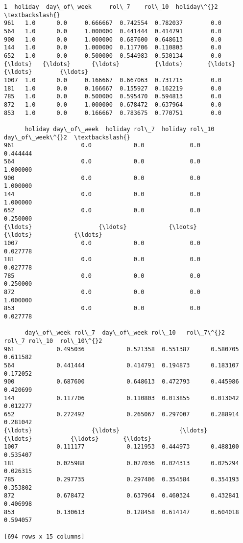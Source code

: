 \documentclass[11pt]{article}
\makeatletter
\newcommand{\boxspacing}{\kern\kvtcb@left@rule\kern\kvtcb@boxsep}
\newcommand{\prompt}[4]{
        {\ttfamily\llap{{\color{#2}[#3]:\hspace{3pt}#4}}\vspace{-\baselineskip}}
    }
\makeatother
\begin{document}
            \begin{tcolorbox}[breakable, size=fbox, boxrule=.5pt, pad at break*=1mm, opacityfill=0]
\prompt{Out}{outcolor}{151}{\boxspacing}
\begin{Verbatim}[commandchars=\\\{\}]
        1  holiday  day\_of\_week     rol\_7    rol\_10  holiday\^{}2  \textbackslash{}
961   1.0      0.0     0.666667  0.742554  0.782037        0.0
564   1.0      0.0     1.000000  0.441444  0.414791        0.0
900   1.0      0.0     1.000000  0.687600  0.648613        0.0
144   1.0      0.0     1.000000  0.117706  0.110803        0.0
652   1.0      0.0     0.500000  0.544983  0.530134        0.0
{\ldots}   {\ldots}      {\ldots}          {\ldots}       {\ldots}       {\ldots}        {\ldots}
1007  1.0      0.0     0.166667  0.667063  0.731715        0.0
181   1.0      0.0     0.166667  0.155927  0.162219        0.0
785   1.0      0.0     0.500000  0.595470  0.594813        0.0
872   1.0      0.0     1.000000  0.678472  0.637964        0.0
853   1.0      0.0     0.166667  0.783675  0.770751        0.0

      holiday day\_of\_week  holiday rol\_7  holiday rol\_10  day\_of\_week\^{}2  \textbackslash{}
961                   0.0            0.0             0.0       0.444444
564                   0.0            0.0             0.0       1.000000
900                   0.0            0.0             0.0       1.000000
144                   0.0            0.0             0.0       1.000000
652                   0.0            0.0             0.0       0.250000
{\ldots}                   {\ldots}            {\ldots}             {\ldots}            {\ldots}
1007                  0.0            0.0             0.0       0.027778
181                   0.0            0.0             0.0       0.027778
785                   0.0            0.0             0.0       0.250000
872                   0.0            0.0             0.0       1.000000
853                   0.0            0.0             0.0       0.027778

      day\_of\_week rol\_7  day\_of\_week rol\_10   rol\_7\^{}2  rol\_7 rol\_10  rol\_10\^{}2
961            0.495036            0.521358  0.551387      0.580705  0.611582
564            0.441444            0.414791  0.194873      0.183107  0.172052
900            0.687600            0.648613  0.472793      0.445986  0.420699
144            0.117706            0.110803  0.013855      0.013042  0.012277
652            0.272492            0.265067  0.297007      0.288914  0.281042
{\ldots}                 {\ldots}                 {\ldots}       {\ldots}           {\ldots}       {\ldots}
1007           0.111177            0.121953  0.444973      0.488100  0.535407
181            0.025988            0.027036  0.024313      0.025294  0.026315
785            0.297735            0.297406  0.354584      0.354193  0.353802
872            0.678472            0.637964  0.460324      0.432841  0.406998
853            0.130613            0.128458  0.614147      0.604018  0.594057

[694 rows x 15 columns]
\end{Verbatim}
\end{tcolorbox}
        
\end{document}

